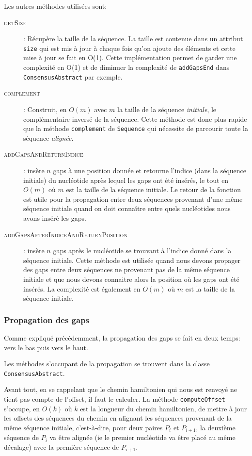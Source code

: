Les autres méthodes utilisées sont:
\begin{description}
	\item[\textsc{getSize}]: Récupère la taille de la séquence. La taille est
		contenue dans un attribut \verb|size| qui est mis à jour à chaque fois
		qu'on ajoute des éléments et cette mise à jour se fait en O(1). Cette
		implémentation permet de garder une complexité en O(1) et de diminuer la
		complexité de \verb|addGapsEnd| dans \verb|ConsensusAbstract| par
		exemple.
	\item[\textsc{complement}]: Construit, en $O(m)$ avec $m$ la taille de la
		séquence \textit{initiale}, le complémentaire inversé de la séquence.
		Cette méthode est donc plus rapide que la méthode \verb|complement| de
		\verb|Sequence| qui nécessite de parcourir toute la séquence
		\textit{alignée}.
	\item[\textsc{addGapsAndReturnIndice}]: insère $n$ gaps à
			une position donnée et retourne l'indice (dans la séquence initiale)
			du nucléotide après lequel les gaps ont été insérés, le tout en
			$O(m)$ où $m$ est la taille de la séquence initiale. Le retour de
			la fonction est utile pour la propagation entre deux séquences
			provenant d'une même séquence initiale quand on doit connaître
			entre quels nucléotides nous avons inséré les gaps.
	\item[\textsc{addGapsAfterIndiceAndReturnPosition}]: insère $n$ gaps après
		le nucléotide se trouvant à l'indice donné dans la séquence initiale.
		Cette méthode est utilisée quand nous devons propager des gaps entre
		deux séquences ne provenant pas de la même séquence initiale et que nous
		devons connaitre alors la position où les gaps ont été insérés. La
		complexité est également en $O(m)$ où $m$ est la taille de la séquence
		initiale.
\end{description}

\subsubsection{Propagation des gaps}

Comme expliqué précédemment, la propagation des gaps se fait en deux temps: vers
le bas puis vers le haut.

Les méthodes s'occupant de la propagation se trouvent dans la classe
\verb|ConsensusAbstract|.

Avant tout, en se rappelant que le chemin hamiltonien qui nous est renvoyé ne
tient pas compte de l'offset, il faut le calculer. La méthode
\verb|computeOffset| s'occupe, en $O(k)$ où $k$ est la longueur du chemin
hamiltonien, de mettre à jour les offsets des séquences du chemin en alignant
les séquences provenant de la même séquence initiale, c'est-à-dire, pour deux
paires $P_{i}$ et $P_{i + 1}$, la deuxième séquence de $P_{i}$ va être alignée
(ie le premier nucléotide va être placé au même décalage) avec la première
séquence de $P_{i + 1}$.

